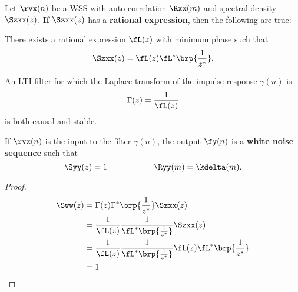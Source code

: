 \begin{theorem}
\label{thm:d-innovations}
Let $\rvx(n)$ be a WSS  with auto-correlation $\Rxx(m)$
and spectral density $\Szxx(z)$.
\textbf{If} $\Szxx(z)$ has a \textbf{rational expression},
then the following are true:

\begin{enume}
   \item There exists a rational expression $\fL(z)$ with minimum phase
         such that
         \[ \Szxx(z) =\fL(z)\fL^\ast\brp{\frac{1}{z^\ast}}. \]
   \item An LTI filter for which the Laplace transform of
         the impulse response $\gamma(n)$ is
         \[ \Gamma(z) = \frac{1}{\fL(z)} \]
         is both causal and stable.
   \item If $\rvx(n)$ is the input to the filter $\gamma(n)$,
         the output $\fy(n)$ is a \textbf{white noise sequence} such that
         \[ \Syy(z)=1 \hspace{2cm} \Ryy(m)=\kdelta(m).\]
\end{enume}
\end{theorem}


\begin{proof}
\begin{align*}
   \Sww(z)
     &= \Gamma(z)\Gamma^\ast\brp{\frac{1}{z^\ast}} \Szxx(z)
   \\&= \frac{1}{\fL(z)} \frac{1}{\fL^\ast\brp{\frac{1}{z^\ast}}} \Szxx(z)
   \\&= \frac{1}{\fL(z)} \frac{1}{\fL^\ast\brp{\frac{1}{z^\ast}}}
        \fL(z)\fL^\ast\brp{\frac{1}{z^\ast}}
   \\&= 1
\end{align*}
\end{proof}

